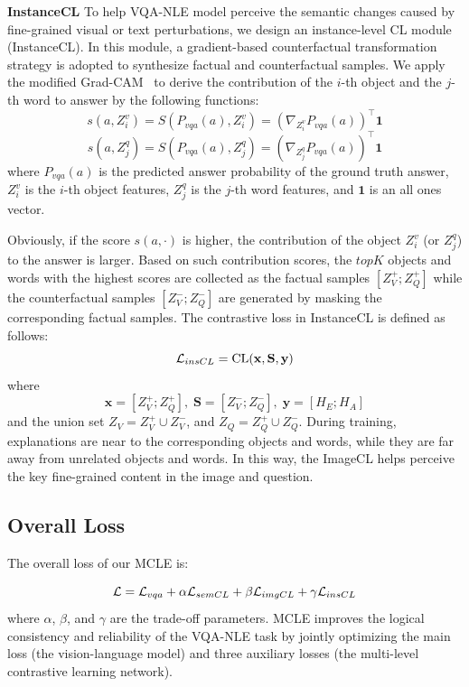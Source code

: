 \documentclass[letterpaper]{article} %
\begin{document}
\noindent
\textbf{InstanceCL} To help VQA-NLE model perceive the semantic changes caused by fine-grained visual or text perturbations, we design an instance-level CL module (InstanceCL). In this module, a gradient-based counterfactual transformation strategy is adopted to synthesize factual and counterfactual samples. We apply the modified Grad-CAM~\cite{selvaraju2017grad} to derive the contribution of the $i$-th object and the $j$-th word to answer by the following functions:
\begin{equation}
	s(a,Z^v_i) = S(P_{vqa}(a),Z^v_i)=(\nabla_{Z^v_i}P_{vqa}(a))^\top \mathbf{1}
\end{equation}
\begin{equation}
	s(a,Z^q_j) = S(P_{vqa}(a),Z^q_j)=(\nabla_{Z^q_j}P_{vqa}(a))^\top \mathbf{1}
\end{equation}
\noindent
where $P_{vqa}(a)$ is the predicted answer probability of the ground truth answer, $Z^v_i$ is the $i$-th object features, $Z^q_j$ is the $j$-th word features, and $\mathbf{1}$ is an all ones vector. 

Obviously, if the score $s(a, \cdot)$ is higher, the contribution of the object $Z^v_i$ (or $Z^q_j$) to the answer is larger. Based on such contribution scores, the $topK$ objects and words with the highest scores are collected as the factual samples $[{Z^+_V;Z^+_Q}]$ while the counterfactual samples $[{Z^-_V;Z^-_Q}]$ are generated by masking the corresponding factual samples. The contrastive loss in InstanceCL is defined as follows:
\begin{equation}	
	\mathcal{L}_{insCL} = \text{CL}(\mathbf{x},\mathbf{S},\mathbf{y})\\
\end{equation}
where
\begin{equation*}	
	\mathbf{x}=[{Z^+_V;Z^+_Q}], \; \mathbf{S}=[{Z^-_V;Z^-_Q}], \; \mathbf{y}=[{H_E;H_A}]
\end{equation*}
and the union set $Z_V = Z^+_V \cup Z^-_V$, and  $Z_Q = Z^+_Q \cup Z^-_Q$. During training, explanations are near to the corresponding objects and words, while they are far away from unrelated objects and words. In this way, the ImageCL helps perceive the key fine-grained content in the image and question.

\subsection{Overall Loss}
The overall loss of our MCLE is:

\begin{equation}	
	\mathcal{L} =\mathcal{L}_{vqa}+	\alpha \mathcal{L}_{semCL}+\beta \mathcal{L}_{imgCL}+\gamma	\mathcal{L}_{insCL}\\
\end{equation}
\noindent
where $\alpha$, $\beta$, and $\gamma$ are the trade-off parameters. MCLE improves the logical consistency and reliability of the VQA-NLE task by jointly optimizing the main loss (the vision-language model) and three auxiliary losses (the multi-level contrastive learning network).
\end{document}
